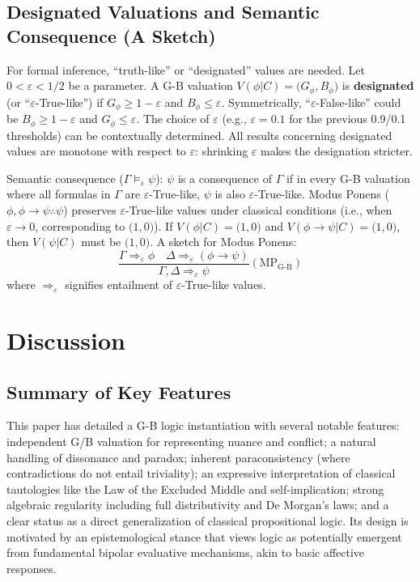 \documentclass[11pt]{article}
\newcommand{\GB}[2]{\bigl(#1,#2\bigr)} %
\theoremstyle{remark}
\begin{document}
\subsection{Designated Valuations and Semantic Consequence (A Sketch)} \label{sec:designated_values_consequence_main}
For formal inference, ``truth-like'' or ``designated'' values are needed. Let $0 < \varepsilon < 1/2$ be a parameter. A G-B valuation $V(\phi|C) = \GB{G_\phi}{B_\phi}$ is \textbf{designated} (or ``$\varepsilon$-True-like'') if $G_\phi \ge 1-\varepsilon$ and $B_\phi \le \varepsilon$. Symmetrically, ``$\varepsilon$-False-like'' could be $B_\phi \ge 1-\varepsilon$ and $G_\phi \le \varepsilon$. The choice of $\varepsilon$ (e.g., $\varepsilon=0.1$ for the previous 0.9/0.1 thresholds) can be contextually determined. All results concerning designated values are monotone with respect to $\varepsilon$: shrinking $\varepsilon$ makes the designation stricter.

Semantic consequence ($\Gamma \vDash_\varepsilon \psi$): $\psi$ is a consequence of $\Gamma$ if in every G-B valuation where all formulas in $\Gamma$ are $\varepsilon$-True-like, $\psi$ is also $\varepsilon$-True-like.
Modus Ponens ($\phi, \phi \rightarrow \psi \therefore \psi$) preserves $\varepsilon$-True-like values under classical conditions (i.e., when $\varepsilon \to 0$, corresponding to $\GB{1}{0}$). If $V(\phi|C)=\GB{1}{0}$ and $V(\phi \rightarrow \psi|C)=\GB{1}{0}$, then $V(\psi|C)$ must be $\GB{1}{0}$. A sketch for Modus Ponens:
\[ \frac{\Gamma \Rightarrow_\varepsilon \phi \quad \Delta \Rightarrow_\varepsilon (\phi \rightarrow \psi)}{\Gamma, \Delta \Rightarrow_\varepsilon \psi} (\text{MP}_{\text{G-B}}) \]
where $\Rightarrow_\varepsilon$ signifies entailment of $\varepsilon$-True-like values.

\section{Discussion}

\subsection{Summary of Key Features}
This paper has detailed a G-B logic instantiation with several notable features: independent G/B valuation for representing nuance and conflict; a natural handling of dissonance and paradox; inherent paraconsistency (where contradictions do not entail triviality); an expressive interpretation of classical tautologies like the Law of the Excluded Middle and self-implication; strong algebraic regularity including full distributivity and De Morgan’s laws; and a clear status as a direct generalization of classical propositional logic. Its design is motivated by an epistemological stance that views logic as potentially emergent from fundamental bipolar evaluative mechanisms, akin to basic affective responses.
\end{document}
